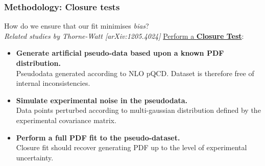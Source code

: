\documentclass[10pt]{beamer}
\begin{document}
\begin{frame}
\frametitle{Methodology: Closure tests}
How do we ensure that our fit minimises \emph{bias}?\\
\emph{Related studies by Thorne-Watt [arXiv:1205.4024]}
\vskip15pt
\underline{Perform a \textbf{Closure Test}}:

\begin{itemize}
\item<1-> \textbf{Generate artificial pseudo-data based upon a known PDF distribution.}\\
		\small Pseudodata generated according to NLO pQCD. Dataset is therefore free of internal inconsistencies.
		\vskip15pt

\item<1-> \textbf{Simulate experimental noise in the pseudodata. }\\
			\small Data points perturbed according to multi-gaussian distribution defined by the experimental
			covariance matrix.
			\vskip15pt
\item<1-> \textbf{Perform a full PDF fit to the pseudo-dataset.}\\
		\small Closure fit should recover generating PDF up to the level of experimental uncertainty.
\end{itemize}

\end{frame}
\end{document}
